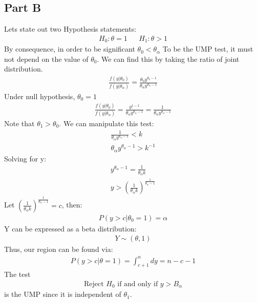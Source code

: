 \documentclass{article}
\begin{document}
\subsection*{Part B}
Lets state out two Hypothesis statements:
\begin{align*}
H_0: \theta = 1 && H_1 : \theta > 1
\end{align*}
By consequence, in order to be significant $\theta_0 < \theta_\alpha$
To be the UMP test, it must not depend on the value of $\theta_0$. We can find this by taking the ratio of joint distribution.
\begin{align*}
\frac{f(y|\theta_0)}{f(y|\theta_\alpha)} = \frac{\theta_0 y^{\theta_0-1}}{\theta_\alpha y^{\theta_\alpha-1}}
\end{align*}
Under null hypothesis, $\theta_0=1$
\begin{align*}
\frac{f(y|\theta_0)}{f(y|\theta_\alpha)} = \frac{y^{1-1}}{\theta_\alpha y^{\theta_\alpha-1}} = \frac{1}{\theta_\alpha y^{\theta_\alpha-1}}
\end{align*}
Note that $\theta_1>\theta_0$. We can manipulate this test:
\begin{align*}
\frac{1}{\theta_\alpha y^{\theta_\alpha-1}} < k \\
\theta_\alpha y^{\theta_\alpha-1} > k^{-1}
\end{align*}
Solving for y:
\begin{align*}
y^{\theta_\alpha - 1}= \frac{1}{\theta_\alpha k} \\
y > (\frac{1}{\theta_\alpha k})^{\frac{1}{\theta_\alpha - 1}}
\end{align*}
Let $(\frac{1}{\theta_\alpha k})^{\frac{1}{\theta_\alpha - 1}}=c$, then:
\begin{align*}
P(y>c|\theta_0 = 1) = \alpha
\end{align*}
Y can be expressed as a beta distribution:
\begin{align*}
Y \sim (\theta,1)
\end{align*}
Thus, our region can be found via:
\begin{align*}
P(y>c|\theta = 1) = \int_{c+1}^{n} dy = n-c-1
\end{align*}
The test
\begin{align*}
\text{Reject } H_0 \text{ if and only if } y>B_\alpha
\end{align*}
is the UMP since it is independent of $\theta_1$.
\clearpage
\end{document}
